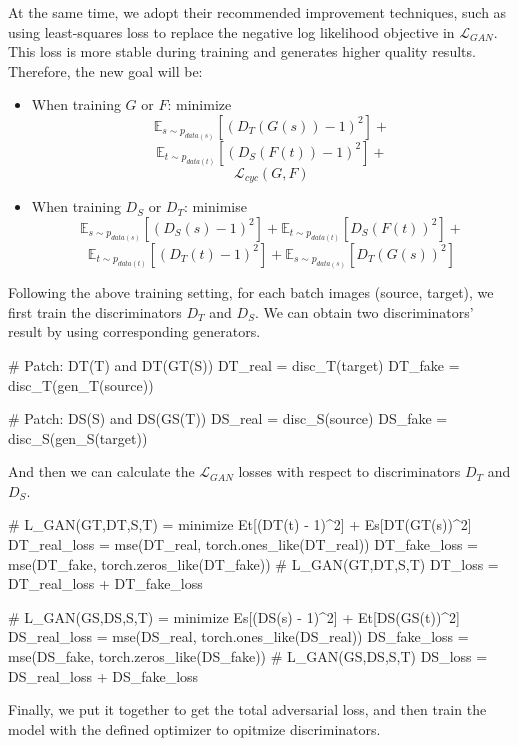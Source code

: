 At the same time, we adopt their recommended improvement techniques, such as using least-squares loss to replace the negative log likelihood objective in $\mathcal{L}_{GAN}$. This loss is more stable during training and generates higher quality results. Therefore, the new goal will be:

\begin{itemize}
    \item When training $G$ or $F$: minimize 
    \[\mathbb{E}_{s \sim p_{data(s)}}[{(D_T(G(s)) - 1)}^2] +\] 
    \[\mathbb{E}_{t \sim p_{data(t)}}[{(D_S(F(t)) - 1)}^2] +\] 
    \[\mathcal{L}_{cyc}(G,F)\]
    \item When training $D_S$ or $D_T$: minimise 
    \[\mathbb{E}_{s \sim p_{data(s)}}[{(D_S(s) - 1)}^2] + \mathbb{E}_{t \sim p_{data(t)}}[{D_S(F(t))}^2] +\] 
    \[\mathbb{E}_{t \sim p_{data(t)}}[{(D_T(t) - 1)}^2] + \mathbb{E}_{s \sim p_{data(s)}}[{D_T(G(s))}^2]\]
\end{itemize}

Following the above training setting, for each batch images (source, target), we first train the discriminators $D_T$ and $D_S$. We can obtain two discriminators' result by using corresponding generators.

\begin{python}
# Patch: DT(T) and DT(GT(S))
DT_real = disc_T(target)
DT_fake = disc_T(gen_T(source))

# Patch: DS(S) and DS(GS(T))
DS_real = disc_S(source)
DS_fake = disc_S(gen_S(target))
\end{python}

And then we can calculate the $\mathcal{L}_{GAN}$ losses with respect to discriminators $D_T$ and $D_S$.

\begin{python}
# L_GAN(GT,DT,S,T) = minimize Et[(DT(t) - 1)^2] + Es[DT(GT(s))^2]
DT_real_loss = mse(DT_real, torch.ones_like(DT_real))
DT_fake_loss = mse(DT_fake, torch.zeros_like(DT_fake))
# L_GAN(GT,DT,S,T)
DT_loss = DT_real_loss + DT_fake_loss

# L_GAN(GS,DS,S,T) = minimize Es[(DS(s) - 1)^2] + Et[DS(GS(t))^2]
DS_real_loss = mse(DS_real, torch.ones_like(DS_real))
DS_fake_loss = mse(DS_fake, torch.zeros_like(DS_fake))
# L_GAN(GS,DS,S,T) 
DS_loss = DS_real_loss + DS_fake_loss
\end{python}

Finally, we put it together to get the total adversarial loss, and then train the model with the defined optimizer to opitmize discriminators.

